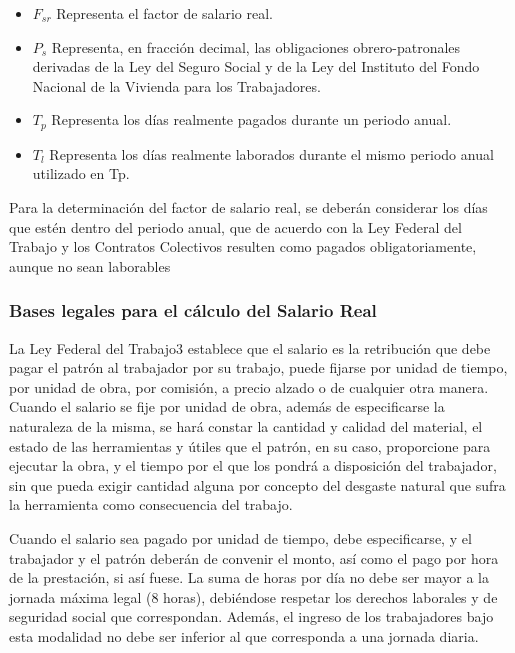 \begin{notation}
    \begin{itemize}
        \item $F_{sr}$ Representa el factor de salario real.
        \item $P_s$ Representa, en fracción decimal, las obligaciones obrero-patronales derivadas de la Ley del Seguro Social y de la Ley del Instituto del Fondo Nacional de la Vivienda para los Trabajadores.
        \item $T_p$ Representa los días realmente pagados durante un periodo anual.
        \item $T_l$ Representa los días realmente laborados durante el mismo periodo anual utilizado en Tp.
    \end{itemize}
\end{notation}
Para la determinación del factor de salario real, se deberán considerar los días que estén dentro del periodo anual, que de acuerdo con la Ley Federal del Trabajo y los Contratos Colectivos resulten como pagados obligatoriamente, aunque no sean laborables

\subsubsection{Bases legales para el cálculo del Salario Real}
La Ley Federal del Trabajo3 establece que el salario es la retribución que debe pagar el patrón al trabajador por su trabajo, puede fijarse por unidad de tiempo, por unidad de obra, por comisión, a precio alzado o de cualquier otra manera. Cuando el salario se fije por unidad de obra, además de especificarse la naturaleza de la misma, se hará constar la cantidad y calidad del material, el estado de las herramientas y útiles que el patrón, en su caso, proporcione para ejecutar la obra, y el tiempo por el que los pondrá a disposición del trabajador, sin que pueda exigir cantidad alguna por concepto del desgaste natural que sufra la herramienta como consecuencia del trabajo.

Cuando el salario sea pagado por unidad de tiempo, debe especificarse, y el trabajador y el patrón deberán de convenir el monto, así como el pago por hora de la prestación, si así fuese. La suma de horas por día no debe ser mayor a la jornada máxima legal (8 horas), debiéndose respetar los derechos laborales y de seguridad social que correspondan. Además, el ingreso de los trabajadores bajo esta modalidad no debe ser inferior al que corresponda a una jornada diaria.

